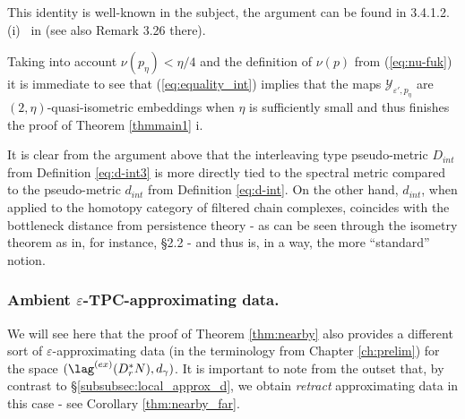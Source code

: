  This identity is well-known in the subject, the argument can be 
 found in 3.4.1.2.(i) \  in  \cite{BCZ:tpc} (see also Remark 3.26 there).
 
 Taking into account $\nu(p_{\eta})< \eta/4$ and the definition of $\nu(p)$ from 
 (\ref{eq:nu-fuk}) it is immediate to see that (\ref{eq:equality_int}) implies that the maps $\mathcal{Y}_{\varepsilon', p_{\eta}}$ are $(2,\eta)$-quasi-isometric embeddings when $\eta$ is sufficiently small and thus finishes the proof of Theorem \ref{thmmain1} i.
 
 
 
 
 \begin{rem}\label{rem:div_int_metr}
 It is clear from the argument above that the interleaving type pseudo-metric $D_{int}$ from Definition \ref{eq:d-int3} is more directly tied to the spectral metric compared to the pseudo-metric $d_{int}$ from Definition \ref{eq:d-int}. On the other hand, $d_{int}$, when applied to the homotopy category of filtered chain complexes, coincides with the bottleneck distance from persistence theory - as can be seen through the isometry theorem as in, for instance, \S 2.2 \cite{PRSZ:top-pers} - and thus is, in a way, the more ``standard'' notion.
 \end{rem}
 

 
 \subsubsection{Ambient $\varepsilon$-TPC-approximating data.} \label{subsubsec:amb_approx_d} We will see here that the
 proof of Theorem \ref{thm:nearby} also provides a different sort of  $\varepsilon$-approximating data  (in the terminology from Chapter \ref{ch:prelim}) for the 
 space $(\lag^{(ex)}(D^{\ast}_{r}N), d_{\gamma})$. It is important to note from the outset
 that, by contrast to \S\ref{subsubsec:local_approx_d}, we obtain {\em retract} approximating data in this case - see Corollary \ref{thm:nearby_far}.
  
